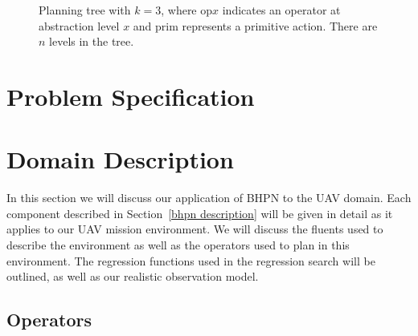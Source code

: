 \documentclass[12pt]{article}
\begin{document}
\begin{figure}
{\begin{tikzpicture}
\end{tikzpicture}
} %

 \caption{Planning tree with $k=3$, where op$x$ indicates an operator at abstraction level $x$ and prim represents a primitive action. There are $n$ levels in the tree.}
 \label{hpn tree}
\end{figure}

\section{Problem Specification}

\section{Domain Description}

In this section we will discuss our application of BHPN to the UAV domain. Each component described in Section~\ref{bhpn description} will be given in detail as it applies to our UAV mission environment. We will discuss the fluents used to describe the environment as well as the operators used to plan in this environment. The regression functions used in the regression search will be outlined, as well as our realistic observation model.

\subsection{Operators} \label{domain operators}
\end{document}

